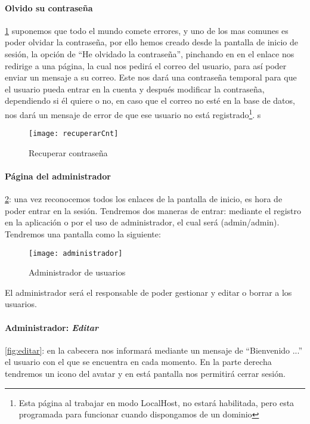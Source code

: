 \paragraph{Olvido su contraseña} \ref{fig:olvido} suponemos que todo el mundo comete errores, y uno de los mas comunes es poder olvidar la contraseña, por ello hemos creado desde la pantalla de inicio de sesión, la opción de ``He olvidado la contraseña'', pinchando en en el enlace nos redirige a una página, la cual nos pedirá el correo del usuario, para así poder enviar un mensaje a su correo. Este nos dará una contraseña temporal para que el usuario pueda entrar en la cuenta y después modificar la contraseña, dependiendo si él quiere o no, en caso que el correo no esté en la base de datos, nos dará un mensaje de error de que ese usuario no está registrado\footnote{Esta página al trabajar en modo LocalHost, no estará habilitada, pero esta programada para funcionar cuando dispongamos de un dominio}.  s

\begin{figure}[H]
    \centering
    \texttt{[image: recuperarCnt]}
    \caption{Recuperar contraseña}
    \label{fig:olvido}
\end{figure}

\paragraph{Página del administrador} \ref{fig:admin}: una vez reconocemos todos los enlaces de la pantalla de inicio, es hora de poder entrar en la sesión. Tendremos dos maneras de entrar: mediante el registro en la aplicación o por el uso de administrador, el cual será (admin/admin). Tendremos una pantalla como la siguiente: 

 \begin{figure}[H]
    \centering
    \texttt{[image: administrador]}
    \caption{Administrador de usuarios}
    \label{fig:admin}
\end{figure}

El administrador será el responsable de poder gestionar y editar o borrar a los usuarios.

\paragraph{Administrador: \textit{Editar}} \ref{fig:editar}: en la cabecera nos informará mediante un mensaje de ``Bienvenido ...'' el usuario con el que se encuentra en cada momento. En la parte derecha tendremos un icono del avatar y en está pantalla nos permitirá cerrar sesión.

